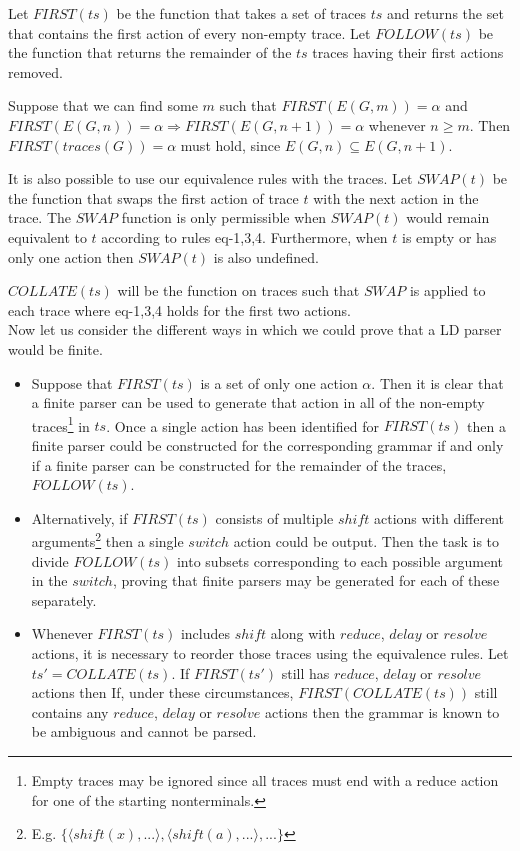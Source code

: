 \documentclass[A4]{sig-alternate}
\begin{document}
Let $F\!I\!RST(ts)$ be the function that takes a set of traces $ts$ and returns the set that contains the first action of every non-empty trace.
Let $FOLLOW(ts)$ be the function that returns the remainder of the $ts$ traces having their first actions removed.

Suppose that we can find some $m$ such that $F\!I\!RST(E(G,m)) = \alpha$ and $F\!I\!RST(E(G,n)) = \alpha \Rightarrow FIRST(E(G,n+1)) = \alpha$ whenever $n \geq m$.
Then $F\!I\!RST(traces(G)) = \alpha$ must hold, since $E(G,n) \subseteq E(G, n+1)$.

It is also possible to use our equivalence rules with the traces. 
Let $SW\!AP(t)$ be the function that swaps the first action of trace $t$ with the next action in the trace.
The $SW\!AP$ function is only permissible when $SW\!AP(t)$ would remain equivalent to $t$ according to rules eq-1,3,4.
Furthermore, when $t$ is empty or has only one action then $SW\!AP(t)$ is also undefined.

$COLLATE(ts)$ will be the function on traces such that $SW\!AP$ is applied to each trace where eq-1,3,4 holds for the first two actions. \\

Now let us consider the different ways in which we could prove that a LD parser would be finite.
\begin{itemize}
  \item Suppose that $F\!I\!RST(ts)$ is a set of only one action $\alpha$. 
        Then it is clear that a finite parser can be used to generate that action in all of the non-empty traces\footnote{Empty traces may be ignored since all traces must end with a reduce action for one of the starting nonterminals.} in $ts$.
        Once a single action has been identified for $F\!I\!RST(ts)$ then a finite parser could be constructed for the corresponding grammar if and only if a finite parser can be constructed for the remainder of the traces, $FOLLOW(ts)$.

  \item Alternatively, if $F\!I\!RST(ts)$ consists of multiple $shi\!ft$ actions with different arguments\footnote{E.g. $\{\langle shi\!ft(x), ... \rangle, \langle shi\!ft(a), ... \rangle, ... \}$} then 
        a single $switch$ action could be output. Then the task is to divide $FOLLOW(ts)$ into subsets corresponding to each possible argument in the $switch$, proving that finite parsers may be generated for each of these separately.

  \item Whenever $F\!I\!RST(ts)$ includes $shi\!ft$ along with $reduce$, $delay$ or $resolve$ actions, it is necessary to reorder those traces using the equivalence rules.
        Let $ts' = COLLATE(ts)$. If $F\!I\!RST(ts')$ still has $reduce$, $delay$ or $resolve$ actions then 
        If, under these circumstances, $F\!I\!RST(COLLATE(ts))$ still contains any $reduce$, $delay$ or $resolve$ actions then the grammar is known to be ambiguous and cannot be parsed.
\end{itemize}
\end{document}
